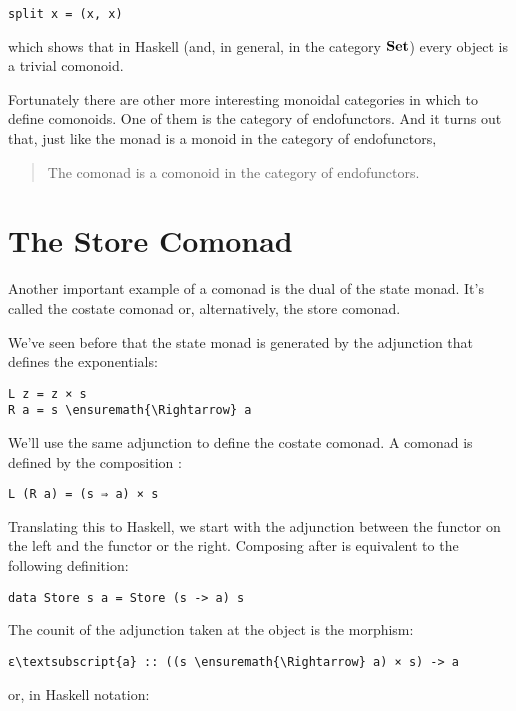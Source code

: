 \begin{Verbatim}[commandchars=\\\{\}]
split x = (x, x)
\end{Verbatim}
which shows that in Haskell (and, in general, in the category
$\mathbf{Set}$) every object is a trivial comonoid.

Fortunately there are other more interesting monoidal categories in
which to define comonoids. One of them is the category of endofunctors.
And it turns out that, just like the monad is a monoid in the category
of endofunctors,

\begin{quote}
The comonad is a comonoid in the category of endofunctors.
\end{quote}

\section{The Store Comonad}\label{the-store-comonad}

Another important example of a comonad is the dual of the state monad.
It's called the costate comonad or, alternatively, the store comonad.

We've seen before that the state monad is generated by the adjunction
that defines the exponentials:

\begin{Verbatim}[commandchars=\\\{\}]
L z = z × s
R a = s \ensuremath{\Rightarrow} a
\end{Verbatim}
We'll use the same adjunction to define the costate comonad. A comonad
is defined by the composition :

\begin{Verbatim}[commandchars=\\\{\}]
L (R a) = (s ⇒ a) × s
\end{Verbatim}
Translating this to Haskell, we start with the adjunction between the
 functor on the left and the  functor or the
right. Composing  after  is equivalent to
the following definition:

\begin{Verbatim}[commandchars=\\\{\}]
data Store s a = Store (s -> a) s
\end{Verbatim}
The counit of the adjunction taken at the object  is the
morphism:

\begin{Verbatim}[commandchars=\\\{\}]
ε\textsubscript{a} :: ((s \ensuremath{\Rightarrow} a) × s) -> a
\end{Verbatim}
or, in Haskell notation:

